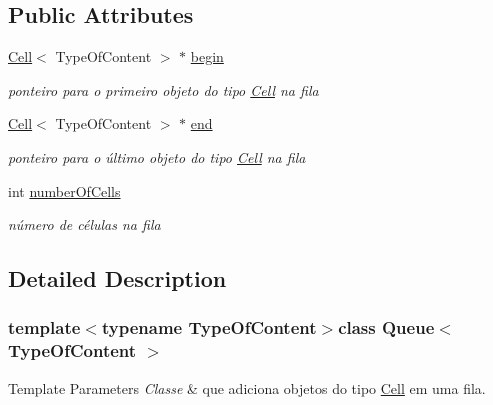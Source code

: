\subsection*{Public Attributes}
\begin{DoxyCompactItemize}
\item 
\hypertarget{classQueue_ae3ffe6f2a9b275643d3ffcc5f11cff19}{\hyperlink{classCell}{Cell}$<$ Type\+Of\+Content $>$ $\ast$ \hyperlink{classQueue_ae3ffe6f2a9b275643d3ffcc5f11cff19}{begin}}\label{classQueue_ae3ffe6f2a9b275643d3ffcc5f11cff19}

\begin{DoxyCompactList}\small\item\em ponteiro para o primeiro objeto do tipo \hyperlink{classCell}{Cell} na fila \end{DoxyCompactList}\item 
\hypertarget{classQueue_aad5593b7bf69ed85f24101d570d43816}{\hyperlink{classCell}{Cell}$<$ Type\+Of\+Content $>$ $\ast$ \hyperlink{classQueue_aad5593b7bf69ed85f24101d570d43816}{end}}\label{classQueue_aad5593b7bf69ed85f24101d570d43816}

\begin{DoxyCompactList}\small\item\em ponteiro para o último objeto do tipo \hyperlink{classCell}{Cell} na fila \end{DoxyCompactList}\item 
\hypertarget{classQueue_a839fc640b49b1b6e1c1646ab7cc6af95}{int \hyperlink{classQueue_a839fc640b49b1b6e1c1646ab7cc6af95}{number\+Of\+Cells}}\label{classQueue_a839fc640b49b1b6e1c1646ab7cc6af95}

\begin{DoxyCompactList}\small\item\em número de células na fila \end{DoxyCompactList}\end{DoxyCompactItemize}


\subsection{Detailed Description}
\subsubsection*{template$<$typename Type\+Of\+Content$>$class Queue$<$ Type\+Of\+Content $>$}


\begin{DoxyTemplParams}{Template Parameters}
{\em Classe} & que adiciona objetos do tipo \hyperlink{classCell}{Cell} em uma fila. \\
\hline
\end{DoxyTemplParams}


